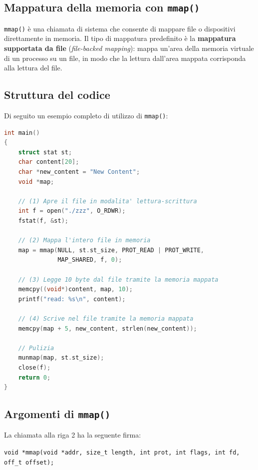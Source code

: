 \documentclass{article}
\begin{document}
\subsection*{Mappatura della memoria con \texttt{mmap()}}

\texttt{mmap()} è una chiamata di sistema che consente di mappare file o dispositivi direttamente in memoria. Il tipo di mappatura predefinito è la \textbf{mappatura supportata da file} (\textit{file-backed mapping}): mappa un'area della memoria virtuale di un processo su un file, in modo che la lettura dall'area mappata corrisponda alla lettura del file.

\subsection{Struttura del codice}

Di seguito un esempio completo di utilizzo di \texttt{mmap()}:

\begin{lstlisting}[language=C, caption={Esempio di memory mapping con mmap()}]
int main()
{
    struct stat st;
    char content[20];
    char *new_content = "New Content";
    void *map;

    // (1) Apre il file in modalita' lettura-scrittura
    int f = open("./zzz", O_RDWR);
    fstat(f, &st);

    // (2) Mappa l'intero file in memoria
    map = mmap(NULL, st.st_size, PROT_READ | PROT_WRITE,
               MAP_SHARED, f, 0);

    // (3) Legge 10 byte dal file tramite la memoria mappata
    memcpy((void*)content, map, 10);
    printf("read: %s\n", content);

    // (4) Scrive nel file tramite la memoria mappata
    memcpy(map + 5, new_content, strlen(new_content));

    // Pulizia
    munmap(map, st.st_size);
    close(f);
    return 0;
}
\end{lstlisting}

\subsection*{Argomenti di \texttt{mmap()}}

La chiamata alla riga 2 ha la seguente firma:
\begin{center}
\texttt{void *mmap(void *addr, size\_t length, int prot, int flags, int fd, off\_t offset);}
\end{center}
\end{document}
